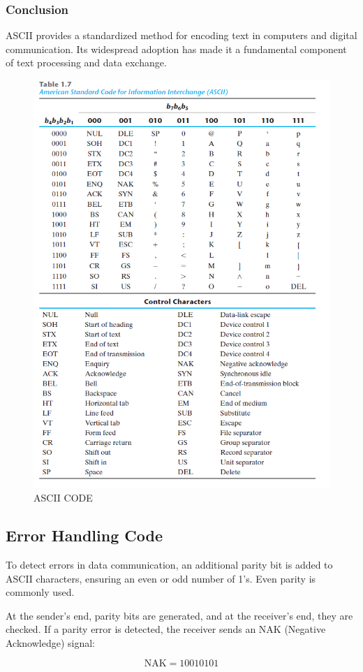\documentclass[a4paper,12pt]{article}
\begin{document}
\subsubsection{Conclusion}
ASCII provides a standardized method for encoding text in computers and digital communication. Its widespread adoption has made it a fundamental component of text processing and data exchange.
\begin{figure}
    \centering
    \includegraphics[width=0.8\linewidth]{figs/1.png}
    \caption{ASCII CODE}
    \label{fig:enter-label}
\end{figure}
\subsection{Error Handling Code}
To detect errors in data communication, an additional parity bit is added to ASCII characters, ensuring an even or odd number of 1’s. Even parity is commonly used. 

At the sender's end, parity bits are generated, and at the receiver's end, they are checked. If a parity error is detected, the receiver sends an NAK (Negative Acknowledge) signal:

\[
\text{NAK} = 10010101
\]
\end{document}
